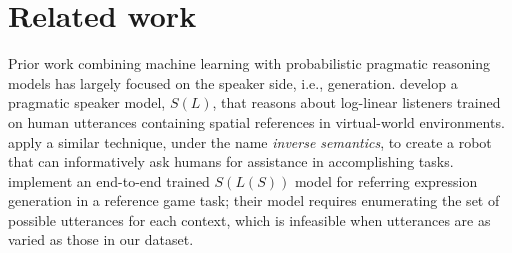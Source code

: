 \documentclass[11pt,letterpaper]{article}
\newcommand{\term}{\textit}
\newcommand{\Listener}{L}
\newcommand{\Speaker}{S}
\renewcommand{\|}{\mid}
\newcommand{\figref}[1]{Figure~\ref{#1}}
\newcommand{\ndg}[1]{\textcolor{Green}{[ndg: #1]}}
\begin{document}

\section{Related work}

Prior work combining machine learning with probabilistic pragmatic reasoning
models has largely focused on the speaker side, i.e., generation.
 develop a pragmatic speaker model,
$\Speaker(\Listener)$, that reasons about log-linear listeners trained on human
utterances containing spatial references in virtual-world environments.
 apply a similar technique, under the name
\term{inverse semantics}, to create a robot that can informatively ask
humans for assistance in accomplishing tasks.  implement
an end-to-end trained $\Speaker(\Listener(\Speaker))$ model for referring
expression generation in a reference game task; their model requires enumerating
the set of possible utterances for each context, which is infeasible when
utterances are as varied as those in our dataset.
\end{document}
